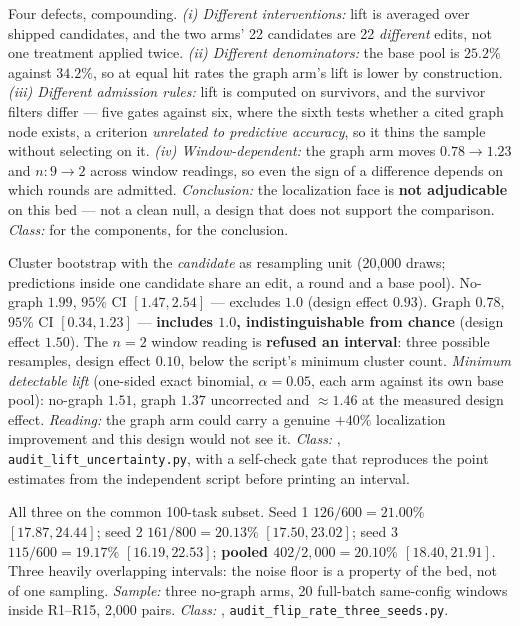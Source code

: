 \begin{description}[leftmargin=0pt,style=nextline,font=\normalfont,itemsep=6pt]
\item[\textbf{F9c}\quad Why F9a and F9b are not an arm comparison.]
Four defects, compounding. \emph{(i) Different interventions:} lift is
averaged over shipped candidates, and the two arms' 22 candidates are 22
\emph{different} edits, not one treatment applied twice. \emph{(ii)
Different denominators:} the base pool is $25.2\%$ against $34.2\%$, so at
equal hit rates the graph arm's lift is lower by construction.
\emph{(iii) Different admission rules:} lift is computed on survivors, and
the survivor filters differ --- five gates against six, where the sixth
tests whether a cited graph node exists, a criterion \emph{unrelated to
predictive accuracy}, so it thins the sample without selecting on it.
\emph{(iv) Window-dependent:} the graph arm moves $0.78 \to 1.23$ and
$n: 9 \to 2$ across window readings, so even the sign of a difference
depends on which rounds are admitted. \emph{Conclusion:} the localization
face is \textbf{not adjudicable} on this bed --- not a clean null, a design
that does not support the comparison. \emph{Class:}  for the
components,  for the conclusion.

\item[\textbf{F9d}\quad Uncertainty on the lift estimates.]
Cluster bootstrap with the \emph{candidate} as resampling unit (20{,}000
draws; predictions inside one candidate share an edit, a round and a base
pool). No-graph $1.99$, $95\%$ CI $[1.47, 2.54]$ --- excludes $1.0$
(design effect $0.93$). Graph $0.78$, $95\%$ CI $[0.34, 1.23]$ ---
\textbf{includes $1.0$, indistinguishable from chance} (design effect
$1.50$). The $n=2$ window reading is \textbf{refused an interval}: three
possible resamples, design effect $0.10$, below the script's minimum
cluster count. \emph{Minimum detectable lift} (one-sided exact binomial,
$\alpha = 0.05$, each arm against its own base pool): no-graph $1.51$,
graph $1.37$ uncorrected and $\approx 1.46$ at the measured design effect.
\emph{Reading:} the graph arm could carry a genuine $+40\%$ localization
improvement and this design would not see it. \emph{Class:} ,
\texttt{audit\_lift\_uncertainty.py}, with a self-check gate that
reproduces the point estimates from the independent script before printing
an interval.

\item[\textbf{F9e}\quad Wilson intervals on the same-config flip rate,
      three seeds.]
All three on the common 100-task subset. Seed 1 $126/600 = 21.00\%$
$[17.87, 24.44]$; seed 2 $161/800 = 20.13\%$ $[17.50, 23.02]$; seed 3
$115/600 = 19.17\%$ $[16.19, 22.53]$; \textbf{pooled $402/2{,}000 =
20.10\%$ $[18.40, 21.91]$}. Three heavily overlapping intervals: the noise
floor is a property of the bed, not of one sampling. \emph{Sample:} three
no-graph arms, 20 full-batch same-config windows inside R1--R15, 2{,}000
pairs. \emph{Class:} ,
\texttt{audit\_flip\_rate\_three\_seeds.py}.


\end{description}

